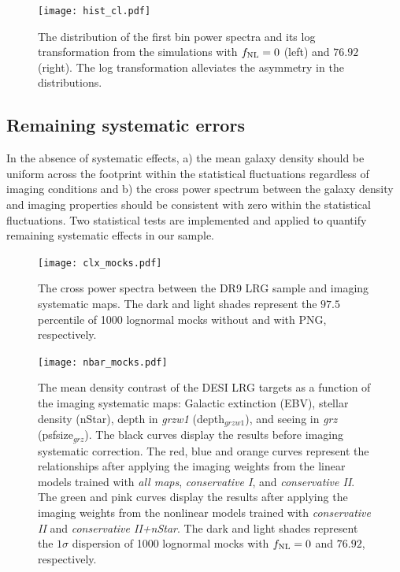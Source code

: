 \begin{figure}
\centering
\texttt{[image: hist\_cl.pdf]}
\caption{The distribution of the first bin power spectra and its log transformation from the simulations with $f_{\rm NL}=0$ (left) and $76.92$ (right). The log transformation alleviates the asymmetry in the distributions.}\label{fig:histcell}
\end{figure}


\subsection{Remaining systematic errors}
\label{ssec:characterization}

In the absence of systematic effects, a) the mean galaxy density should be uniform across the footprint within the statistical fluctuations regardless of imaging conditions and b) the cross power spectrum between the galaxy density and imaging properties should be consistent with zero within the statistical fluctuations. Two statistical tests are implemented and applied to quantify remaining systematic effects in our sample.

\begin{figure}
\centering
\texttt{[image: clx\_mocks.pdf]}
\caption{The cross power spectra between the DR9 LRG sample and imaging systematic maps. The dark and light shades represent the $97.5$ percentile of 1000 lognormal mocks without and with PNG, respectively.}\label{fig:clxmock}
\end{figure}

\begin{figure}
\centering
\texttt{[image: nbar\_mocks.pdf]}
\caption{The mean density contrast of the DESI LRG targets as a function of the imaging systematic maps: Galactic extinction (EBV), stellar density (nStar), depth in \textit{grzw1} (depth$_{grzw1}$), and seeing in \textit{grz} (psfsize$_{grz}$). The black curves display the results before imaging systematic correction. The red, blue and orange curves represent the relationships after applying the imaging weights from the linear models trained with \textit{all maps}, \textit{conservative I}, and \textit{conservative II}. The green and pink curves display the results after applying the imaging weights from the nonlinear models trained with \textit{conservative II} and \textit{conservative II+nStar}. The dark and light shades represent the $1\sigma$ dispersion of 1000 lognormal mocks with $f_{\rm NL}=0$ and $76.92$, respectively.}\label{fig:nbarmock}
\end{figure}


